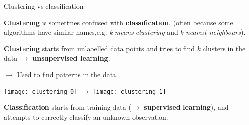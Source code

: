 \documentclass[compress,xcolor=table]{beamer}
\begin{document}
%
%
%

%
%
%
%    
%
%
%
%


\begin{frame}{Clustering vs classification}

\textbf{Clustering} is sometimes confused with \textbf{classification}.  (often
    because some algorithms have similar names,e.g. \emph{k-means clustering}
    and \emph{k-nearest neighbours}).

\textbf{Clustering} starts from unlabelled data points and tries to find
    $k$ clusters in the data $\rightarrow$ \textbf{unsupervised learning}.


$\rightarrow$ Used to find patterns in the data.

    \begin{center}
        \texttt{[image: clustering-0]}
        $\rightarrow$
        \texttt{[image: clustering-1]}
    \end{center}


    \textbf{Classification} starts from training data ($\rightarrow$
    \textbf{supervised learning}), and attempts to correctly classify an
    unknown observation.

\end{frame}
\end{document}
